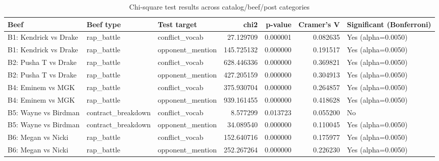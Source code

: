 \begin{table}
\caption{Chi-square test results across catalog/beef/post categories}
\label{tab:table2_chi2_results}
\begin{tabular}{lllrrrl}
\toprule
Beef & Beef type & Test target & chi2 & p-value & Cramer's V & Significant (Bonferroni) \\
\midrule
B1: Kendrick vs Drake & rap\_battle & conflict\_vocab & 27.129709 & 0.000001 & 0.082635 & Yes (alpha=0.0050) \\
B1: Kendrick vs Drake & rap\_battle & opponent\_mention & 145.725132 & 0.000000 & 0.191517 & Yes (alpha=0.0050) \\
B2: Pusha T vs Drake & rap\_battle & conflict\_vocab & 628.446336 & 0.000000 & 0.369821 & Yes (alpha=0.0050) \\
B2: Pusha T vs Drake & rap\_battle & opponent\_mention & 427.205159 & 0.000000 & 0.304913 & Yes (alpha=0.0050) \\
B4: Eminem vs MGK & rap\_battle & conflict\_vocab & 375.930704 & 0.000000 & 0.264857 & Yes (alpha=0.0050) \\
B4: Eminem vs MGK & rap\_battle & opponent\_mention & 939.161455 & 0.000000 & 0.418628 & Yes (alpha=0.0050) \\
B5: Wayne vs Birdman & contract\_breakdown & conflict\_vocab & 8.577299 & 0.013723 & 0.055200 & No \\
B5: Wayne vs Birdman & contract\_breakdown & opponent\_mention & 34.089540 & 0.000000 & 0.110045 & Yes (alpha=0.0050) \\
B6: Megan vs Nicki & rap\_battle & conflict\_vocab & 152.640716 & 0.000000 & 0.175977 & Yes (alpha=0.0050) \\
B6: Megan vs Nicki & rap\_battle & opponent\_mention & 252.267264 & 0.000000 & 0.226230 & Yes (alpha=0.0050) \\
\bottomrule
\end{tabular}
\end{table}
